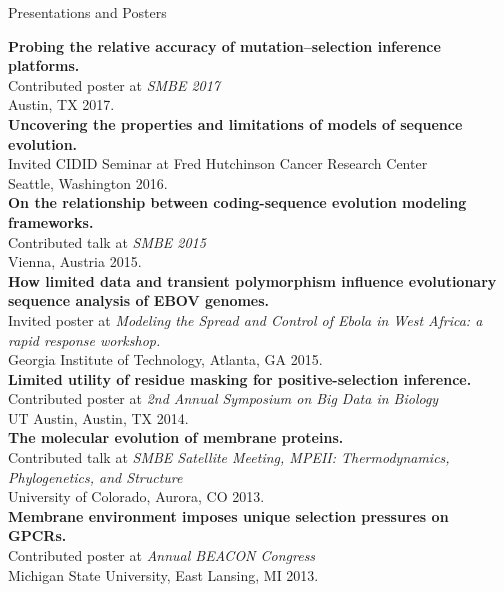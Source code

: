 \documentclass{resume} %
\begin{document}




\vspace*{0.5cm}
\begin{rSection}{Presentations and Posters}
\vspace*{0.25cm}


\textbf{Probing the relative accuracy of mutation--selection inference platforms.}
\\Contributed poster at \emph{SMBE 2017}
\\ Austin, TX 2017.\\

\textbf{Uncovering the properties and limitations of models of sequence evolution.}
\\Invited CIDID Seminar at Fred Hutchinson Cancer Research Center
\\ Seattle, Washington 2016.\\

\textbf{On the relationship between coding-sequence evolution modeling frameworks.}
\\Contributed talk at \emph{SMBE 2015}
\\ Vienna, Austria 2015.\\

\textbf{How limited data and transient polymorphism influence evolutionary sequence analysis of EBOV genomes.}
\\Invited poster at \emph{Modeling the Spread and Control of Ebola in West Africa: a rapid response workshop.}
\\ Georgia Institute of Technology, Atlanta, GA 2015.\\

\textbf{Limited utility of residue masking for positive-selection inference.}
\\Contributed poster at \emph{2nd Annual Symposium on Big Data in Biology}
\\ UT Austin, Austin, TX 2014.\\

\textbf{The molecular evolution of membrane proteins.}
\\Contributed talk at \emph{SMBE Satellite Meeting, MPEII: Thermodynamics, Phylogenetics, and Structure}
\\ University of Colorado, Aurora, CO 2013.\\

\textbf{Membrane environment imposes unique selection pressures on GPCRs.}
\\Contributed poster at \emph{Annual BEACON Congress}
\\ Michigan State University, East Lansing, MI 2013.


\end{rSection}
\end{document}
